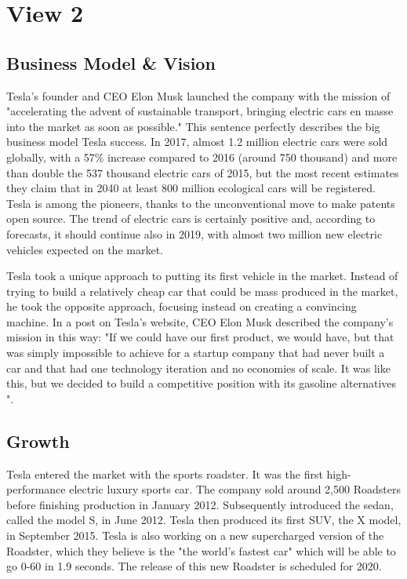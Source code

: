 \section{View 2}
\subsection{Business Model \& Vision}

Tesla's founder and CEO Elon Musk launched the company with the mission of "accelerating the advent of sustainable transport, bringing electric cars en masse into the market as soon as possible." This sentence perfectly describes the big business model Tesla success.
In 2017, almost 1.2 million electric cars were sold globally, with a 57\% increase compared to 2016 (around 750 thousand) and more than double the 537 thousand electric cars of 2015, but the most recent estimates they claim that in 2040 at least 800 million ecological cars will be registered. Tesla is among the pioneers, thanks to the unconventional move to make patents open source. The trend of electric cars is certainly positive and, according to forecasts, it should continue also in 2019, with almost two million new electric vehicles expected on the market.

Tesla took a unique approach to putting its first vehicle in the market. Instead of trying to build a relatively cheap car that could be mass produced in the market, he took the opposite approach, focusing instead on creating a convincing machine. In a post on Tesla's website, CEO Elon Musk described the company's mission in this way: "If we could have our first product, we would have, but that was simply impossible to achieve for a startup company that had never built a car and that had one technology iteration and no economies of scale. It was like this, but we decided to build a competitive position with its gasoline alternatives ".



\subsection{Growth}

Tesla entered the market with the sports roadster. It was the first high-performance electric luxury sports car. The company sold around 2,500 Roadsters before finishing production in January 2012.
Subsequently introduced the sedan, called the model S, in June 2012. Tesla then produced its first SUV, the X model, in September 2015. Tesla is also working on a new supercharged version of the Roadster, which they believe is the "the world's fastest car" which will be able to go 0-60 in 1.9 seconds. The release of this new Roadster is scheduled for 2020.

